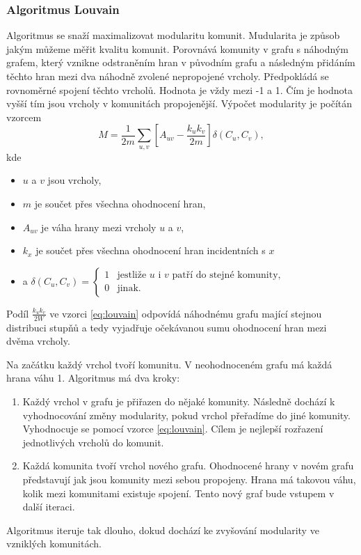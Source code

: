 \documentclass[
  program=infoi,
  biblatex=true,
  sourcecodes=true,
  figures=true,
  glossaries=false,
  index
]{kidiplom}
\begin{document}
\subsubsection{Algoritmus Louvain}
Algoritmus se snaží maximalizovat modularitu komunit. Mudularita je způsob jakým můžeme měřit kvalitu komunit. Porovnává komunity v grafu s náhodným grafem, který vznikne odstraněním hran v původním grafu a následným přidáním těchto hran mezi dva náhodně zvolené nepropojené vrcholy. Předpokládá se rovnoměrné spojení těchto vrcholů. Hodnota je vždy mezi -1 a 1. Čím je hodnota vyšší tím jsou vrcholy v komunitách propojenější. Výpočet modularity je počítán vzorcem
\begin{equation} 
\label{eq:louvain}
M = \frac{1}{2m} \sum_{u,v} [A_{uv} - \frac{k_u k_v}{2m}] \delta (C_u, C_v),
\end{equation}
kde
\begin{itemize}
\item $u$ a $v$ jsou vrcholy,
\item $m$ je součet přes všechna ohodnocení hran,
\item $A_{uv}$ je váha hrany mezi vrcholy $u$ a $v$,
\item $k_x$ je součet přes všechna ohodnocení hran incidentních s $x$
\item a 
$
 \delta (C_u, C_v)=
    \begin{cases}
        1 & \text{jestliže } u \text{ i } v \text{ patří do stejné komunity,} \\
        0 & \text{jinak.}
    \end{cases}
$
\end{itemize}
Podíl $\frac{k_u k_v}{2W}$ ve vzorci \ref{eq:louvain} odpovídá náhodnému grafu mající stejnou distribuci stupňů a tedy vyjadřuje očekávanou sumu ohodnocení hran mezi dvěma vrcholy.

Na začátku každý vrchol tvoří komunitu. V neohodnoceném grafu má každá hrana váhu 1. Algoritmus má dva kroky:
\begin{enumerate}
\item Každý vrchol v grafu je přiřazen do nějaké komunity. Následně dochází k vyhodnocování změny modularity, pokud vrchol přeřadíme do jiné komunity. Vyhodnocuje se pomocí vzorce \ref{eq:louvain}. Cílem je nejlepší rozřazení jednotlivých vrcholů do komunit.
\item Každá komunita tvoří vrchol nového grafu. Ohodnocené hrany v novém grafu představují jak jsou komunity mezi sebou propojeny. Hrana má takovou váhu, kolik mezi komunitami existuje spojení. Tento nový graf bude vstupem v další iteraci.
\end{enumerate}
Algoritmus iteruje tak dlouho, dokud dochází ke zvyšování modularity ve vzniklých komunitách.
\end{document}
